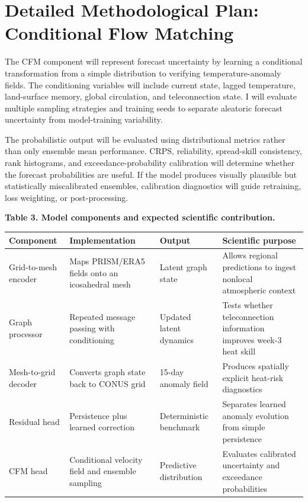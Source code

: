 \documentclass[11pt,letterpaper]{article}
\begin{document}
\newpage
\section*{Detailed Methodological Plan: Conditional Flow Matching}
The CFM component will represent forecast uncertainty by learning a conditional transformation from a simple distribution to verifying temperature-anomaly fields. The conditioning variables will include current state, lagged temperature, land-surface memory, global circulation, and teleconnection state. I will evaluate multiple sampling strategies and training seeds to separate aleatoric forecast uncertainty from model-training variability.

The probabilistic output will be evaluated using distributional metrics rather than only ensemble mean performance. CRPS, reliability, spread-skill consistency, rank histograms, and exceedance-probability calibration will determine whether the forecast probabilities are useful. If the model produces visually plausible but statistically miscalibrated ensembles, calibration diagnostics will guide retraining, loss weighting, or post-processing.

\begin{center}\scriptsize
\textbf{Table 3. Model components and expected scientific contribution.}\\[0.03in]
\begin{tabularx}{\textwidth}{p{}p{}p{}X}
\toprule
\textbf{Component} & \textbf{Implementation} & \textbf{Output} & \textbf{Scientific purpose}\\
\midrule
Grid-to-mesh encoder & Maps PRISM/ERA5 fields onto an icosahedral mesh & Latent graph state & Allows regional predictions to ingest nonlocal atmospheric context\\
Graph processor & Repeated message passing with conditioning & Updated latent dynamics & Tests whether teleconnection information improves week-3 heat skill\\
Mesh-to-grid decoder & Converts graph state back to CONUS grid & 15-day anomaly field & Produces spatially explicit heat-risk diagnostics\\
Residual head & Persistence plus learned correction & Deterministic benchmark & Separates learned anomaly evolution from simple persistence\\
CFM head & Conditional velocity field and ensemble sampling & Predictive distribution & Evaluates calibrated uncertainty and exceedance probabilities\\
\bottomrule
\end{tabularx}
\end{center}
\end{document}
